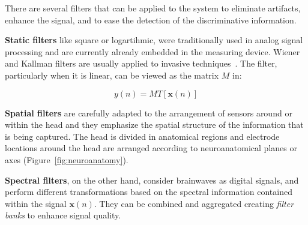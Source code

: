 There are several filters that can be applied to the system to eliminate artifacts, enhance the signal, and to ease the detection of the discriminative information.

\textbf{Static filters} like square or logartihmic, were traditionally used in analog signal processing and are currently already embedded in the measuring device.  Wiener and Kallman filters are usually applied to invasive techniques~\cite{He2013}.  The filter, particularly when it is linear, can be viewed as the matrix $M$ in:

\begin{equation}
y(n) = M T\left[\mathbf{x}(n)\right]
\label{eq:filters}
\end{equation}

\textbf{Spatial filters} are carefully adapted to the arrangement of sensors around or within the head and they emphasize the spatial structure of the information that is being captured. The head is divided in anatomical regions and electrode locations around the head are arranged according to neuroanatomical planes or axes (Figure~\ref{fig:neuroanatomy}).

\textbf{Spectral filters}, on the other hand, consider brainwaves as digital signals, and perform different transformations based on the spectral information contained within the signal $\mathbf{x}(n)$.  They can be combined and aggregated creating  \textit{filter banks} to enhance signal quality. 


